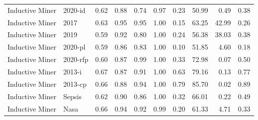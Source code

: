 \begin{tabular}{llrrrrrrrr}
Inductive Miner & 2020-id & 0.62 & 0.88 & 0.74 & 0.97 & 0.23 & 50.99 & 0.49 & 0.38 \\
Inductive Miner & 2017 & 0.63 & 0.95 & 0.95 & 1.00 & 0.15 & 63.25 & 42.99 & 0.26 \\
Inductive Miner & 2019 & 0.59 & 0.92 & 0.80 & 1.00 & 0.24 & 56.38 & 38.03 & 0.38 \\
Inductive Miner & 2020-pl & 0.59 & 0.86 & 0.83 & 1.00 & 0.10 & 51.85 & 4.60 & 0.18 \\
Inductive Miner & 2020-rfp & 0.60 & 0.87 & 0.99 & 1.00 & 0.33 & 72.98 & 0.07 & 0.50 \\
Inductive Miner & 2013-i & 0.67 & 0.87 & 0.91 & 1.00 & 0.63 & 79.16 & 0.13 & 0.77 \\
Inductive Miner & 2013-cp & 0.66 & 0.88 & 0.94 & 1.00 & 0.79 & 85.70 & 0.02 & 0.89 \\
Inductive Miner & Sepsis & 0.62 & 0.90 & 0.86 & 1.00 & 0.32 & 66.01 & 0.22 & 0.49 \\
Inductive Miner & Nasa & 0.66 & 0.94 & 0.92 & 0.99 & 0.20 & 61.33 & 4.71 & 0.33 \\
\bottomrule
\end{tabular}
